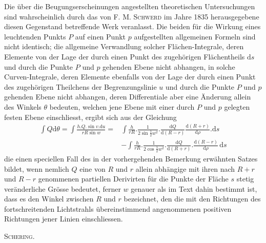 Die über die Beugungserscheinungen angestellten theoretischen Untersuchungen sind wahrscheinlich durch das von \textsc{F. M. Schwerd} im Jahre 1835 herausgegebene diesen Gegenstand betreffende Werk veranlasst. Die beiden für die Wirkung eines leuchtenden Punkts $P$ auf einen Punkt $p$ aufgestellten allgemeinen Formeln sind nicht identisch; die allgemeine Verwandlung solcher Flächen-Integrale, deren Elemente von der Lage der durch einen Punkt des zugehörigen Flächentheils $\mathrm ds$ und durch die Punkte $P$ und $p$ gehenden Ebene nicht abhangen, in solche Curven-Integrale, deren Elemente ebenfalls von der Lage der durch einen Punkt des zugehörigen Theilchens der Begrenzungslinie $u$ und durch die Punkte $P$ und $p$ gehenden Ebene nicht abhangen, deren Differentiale aber eine Änderung allein des Winkels $\theta$ bedeuten, welchen jene Ebene mit einer durch $P$ und $p$ gelegten festen Ebene einschliesst, ergibt sich aus der Gleichung
\[
\begin{aligned}
\int Q\mathrm d\theta=\int\frac{h.Q.\sin v.\mathrm du}{rR\sin w}
={}&\int\frac h{rR}.\frac1{2\sin\frac12w^2}.\frac{\mathrm dQ}{\mathrm d(R-r)}\frac{\mathrm d(R+r)}{\mathrm d\rho}.\mathrm ds\\
&-\int\frac h{rR}.\frac1{2\cos\frac12w^2}.\frac{\mathrm dQ}{\mathrm d(R+r)}.\frac{\mathrm d(R-r)}{\mathrm d\rho}\,\mathrm ds
\end{aligned}
\]
die einen speciellen Fall des in der vorhergehenden Bemerkung erwähnten Satzes bildet, wenn nemlich $Q$ eine von $R$ und $r$ allein abhängige mit ihren nach $R+r$ und $R-r$ genommenen partiellen Derivirten für die Punkte der Fläche $s$ stetig veränderliche Grösse bedeutet, ferner $w$ genauer als im Text dahin bestimmt ist, dass es den Winkel zwischen $R$ und $r$ bezeichnet, den die mit den Richtungen des fortschreitenden Lichtstrahls übereinstimmend angenommenen positiven Richtungen jener Linien einschliessen.

\begin{flushright}\textsc{Schering.}\end{flushright}

\clearpage
{}
